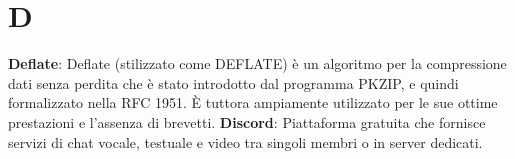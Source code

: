 \section{D}
\textbf{Deflate}: Deflate (stilizzato come DEFLATE) è un algoritmo per la compressione dati senza perdita che è stato introdotto dal programma PKZIP, e quindi formalizzato nella RFC 1951. È tuttora ampiamente utilizzato per le sue ottime prestazioni e l'assenza di brevetti.
\textbf{Discord}: Piattaforma gratuita che fornisce servizi di chat vocale, testuale e video tra singoli membri o in server dedicati.\\
